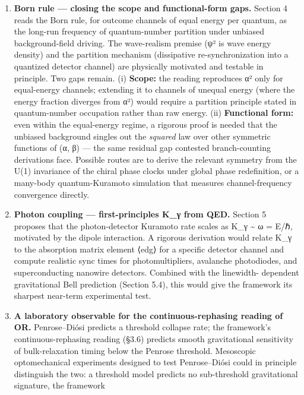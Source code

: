 \documentclass[
]{article}
\begin{document}
\begin{enumerate}
  splice but a consequence of the same K = E/ℏ identification used
  elsewhere in the framework.
\item
  \textbf{Born rule --- closing the scope and functional-form gaps.}
  Section 4 reads the Born rule, for outcome channels of equal energy
  per quantum, as the long-run frequency of quantum-number partition
  under unbiased background-field driving. The wave-realism premise
  (\textbar ψ\textbar² is wave energy density) and the partition
  mechanism (dissipative re-synchronization into a quantized detector
  channel) are physically motivated and testable in principle. Two gaps
  remain. (i) \textbf{Scope:} the reading reproduces \textbar α\textbar²
  only for equal-energy channels; extending it to channels of unequal
  energy (where the energy fraction diverges from \textbar α\textbar²)
  would require a partition principle stated in quantum-number
  occupation rather than raw energy. (ii) \textbf{Functional form:} even
  within the equal-energy regime, a rigorous proof is needed that the
  unbiased background singles out the \emph{squared} law over other
  symmetric functions of (α, β) --- the same residual gap contested
  branch-counting derivations face. Possible routes are to derive the
  relevant symmetry from the U(1) invariance of the chiral phase clocks
  under global phase redefinition, or a many-body quantum-Kuramoto
  simulation that measures channel-frequency convergence directly.
\item
  \textbf{Photon coupling --- first-principles K\_γ from QED.} Section 5
  proposes that the photon-detector Kuramoto rate scales as K\_γ
  \textasciitilde{} ω = E/ℏ, motivated by the dipole interaction. A
  rigorous derivation would relate K\_γ to the absorption matrix element
  ⟨e\textbar d\textbar g⟩ for a specific detector channel and compute
  realistic sync times for photomultipliers, avalanche photodiodes, and
  superconducting nanowire detectors. Combined with the linewidth-
  dependent gravitational Bell prediction (Section 5.4), this would give
  the framework its sharpest near-term experimental test.
\item
  \textbf{A laboratory observable for the continuous-rephasing reading
  of OR.} Penrose--Diósi predicts a threshold collapse rate; the
  framework's continuous-rephasing reading (§3.6) predicts smooth
  gravitational sensitivity of bulk-relaxation timing below the Penrose
  threshold. Mesoscopic optomechanical experiments designed to test
  Penrose--Diósi could in principle distinguish the two: a threshold
  model predicts no sub-threshold gravitational signature, the framework

\end{enumerate}
\end{document}
